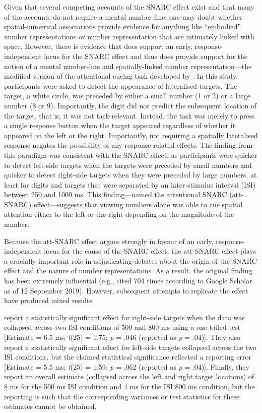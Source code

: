 \documentclass[A4paper,man,floatsintext]{apa6}
\theoremstyle{definition}
\theoremstyle{definition}
\theoremstyle{definition}
\theoremstyle{remark}
\begin{document}
Given that several competing accounts of the SNARC effect exist and that
many of the accounts do not require a mental number line, one may doubt
whether spatial-numerical associations provide evidence for anything
like \enquote{embodied} number representations or number representation
that are intimately linked with space. However, there is evidence that
does support an early, response-independent locus for the SNARC effect
and thus does provide support for the notion of a mental number-line and
spatially-linked number representation---the modified version of the
\textcite{Posner} attentional cueing task developed by
\textcite{Fischer:2003ju}. In this study, participants were asked to
detect the appearance of lateralised targets. The target, a white
circle, was preceded by either a small number (1 or 2) or a large number
(8 or 9). Importantly, the digit did not predict the subsequent location
of the target, that is, it was not task-relevant. Instead, the task was
merely to press a single response button when the target appeared
regardless of whether it appeared on the left or the right. Importantly,
not requiring a spatially lateralised response negates the possibility
of any response-related effects. The finding from this paradigm was
consistent with the SNARC effect, as participants were quicker to detect
left-side targets when the targets were preceded by small numbers and
quicker to detect right-side targets when they were preceded by large
numbers, at least for digits and targets that were separated by an
inter-stimulus interval (ISI) between 250 and 1000 ms. This
finding---named the attentional SNARC (att-SNARC) effect---suggests that
viewing numbers alone was able to cue spatial attention either to the
left or the right depending on the magnitude of the number.

Because the att-SNARC effect argues strongly in favour of an early,
response-independent locus for the cause of the SNARC effect, the
att-SNARC effect plays a crucially important role in adjudicating
debates about the origin of the SNARC effect and the nature of number
representations. As a result, the original finding has been extremely
influential (e.g., cited 704 times according to Google Scholar as of 12
September 2019). However, subsequent attempts to replicate the effect
have produced mixed results.

\textcite{Galfano:2006cu} report a statistically significant effect for
right-side targets when the data was collapsed across two ISI conditions
of 500 and 800 ms using a one-tailed test {[}Estimate = 6.5 ms;
\emph{t}(25) = 1.75; \emph{p} = .046 (reported as \emph{p} = .04){]}.
They also report a statistically significant effect for left-side
targets collapsed across the two ISI conditions, but the claimed
statistical significance reflected a reporting error {[}Estimate = 5.5
ms; \emph{t}(25) = 1.59; \emph{p} = .062 (reported as \emph{p} =
.04){]}. Finally, they report an overall estimate (collapsed across the
left and right target locations) of 8 ms for the 500 ms ISI condition
and 4 ms for the ISI 800 ms condition, but the reporting is such that
the corresponding variances or test statistics for these estimates
cannot be obtained.
\end{document}
